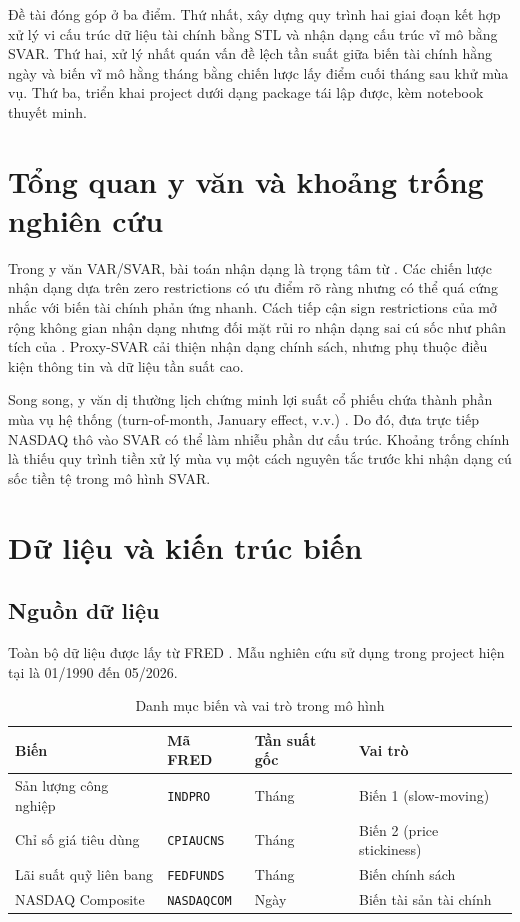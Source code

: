 \documentclass[12pt,a4paper]{article}
\begin{document}
Đề tài đóng góp ở ba điểm. Thứ nhất, xây dựng quy trình hai giai đoạn kết hợp xử lý vi cấu trúc dữ liệu tài chính bằng STL và nhận dạng cấu trúc vĩ mô bằng SVAR. Thứ hai, xử lý nhất quán vấn đề lệch tần suất giữa biến tài chính hằng ngày và biến vĩ mô hằng tháng bằng chiến lược lấy điểm cuối tháng sau khử mùa vụ. Thứ ba, triển khai project dưới dạng package tái lập được, kèm notebook thuyết minh.

\section{Tổng quan y văn và khoảng trống nghiên cứu}

Trong y văn VAR/SVAR, bài toán nhận dạng là trọng tâm từ \citet{sims1980}. Các chiến lược nhận dạng dựa trên zero restrictions có ưu điểm rõ ràng nhưng có thể quá cứng nhắc với biến tài chính phản ứng nhanh. Cách tiếp cận sign restrictions của \citet{uhlig2005} mở rộng không gian nhận dạng nhưng đối mặt rủi ro nhận dạng sai cú sốc như phân tích của \citet{wolf2020}. Proxy-SVAR \citep{gertler2015} cải thiện nhận dạng chính sách, nhưng phụ thuộc điều kiện thông tin và dữ liệu tần suất cao.

Song song, y văn dị thường lịch chứng minh lợi suất cổ phiếu chứa thành phần mùa vụ hệ thống (turn-of-month, January effect, v.v.) \citep{ariel1987,mccconnell2008}. Do đó, đưa trực tiếp NASDAQ thô vào SVAR có thể làm nhiễu phần dư cấu trúc. Khoảng trống chính là thiếu quy trình tiền xử lý mùa vụ một cách nguyên tắc trước khi nhận dạng cú sốc tiền tệ trong mô hình SVAR.

\section{Dữ liệu và kiến trúc biến}

\subsection{Nguồn dữ liệu}

Toàn bộ dữ liệu được lấy từ FRED \citep{fred}. Mẫu nghiên cứu sử dụng trong project hiện tại là 01/1990 đến 05/2026.

\begin{table}[H]
\centering
\caption{Danh mục biến và vai trò trong mô hình}
\label{tab:data}
\begin{tabular}{llll}
\toprule
Biến & Mã FRED & Tần suất gốc & Vai trò \\
\midrule
Sản lượng công nghiệp & \texttt{INDPRO} & Tháng & Biến 1 (slow-moving) \\
Chỉ số giá tiêu dùng & \texttt{CPIAUCNS} & Tháng & Biến 2 (price stickiness) \\
Lãi suất quỹ liên bang & \texttt{FEDFUNDS} & Tháng & Biến chính sách \\
NASDAQ Composite & \texttt{NASDAQCOM} & Ngày & Biến tài sản tài chính \\
\bottomrule
\end{tabular}
\end{table}
\end{document}

